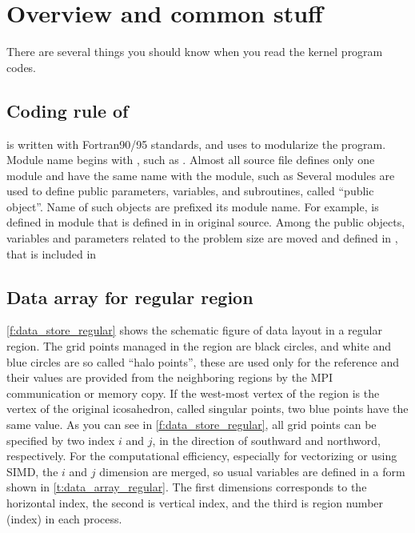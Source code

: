  \section{Overview and common stuff}

There are several things you should know when you read
the kernel program codes.

\subsection{Coding rule of \NICAM}

\NICAM is written with Fortran90/95 standards, and uses  to
modularize the program.
%
Module name begins with , such as .
%
Almost all source file defines only one module and have the same name
with the module, such as 
%
Several modules are used to define public parameters, variables, and
subroutines, called ``public object''.
%
Name of such objects are prefixed its module name.
%
For example,  is defined in module  that is
defined in  in original \NICAM source.
%
Among the public objects, variables and parameters related to the
problem size are moved and defined in , that is
included in 

\subsection{Data array for regular region}

\autoref{f:data_store_regular} shows the schematic figure of data layout
in a regular region.
%
The grid points managed in the region are black circles, and white and
blue circles are so called ``halo points'', these are used only for the
reference and their values are provided from the neighboring regions by
the MPI communication or memory copy.
%
If the west-most vertex of the region is the vertex of the original
icosahedron, called singular points, two blue points have the same
value.
%
As you can see in \autoref{f:data_store_regular}, all grid points can be
specified by two index $i$ and $j$, in the direction of southward and
northword, respectively.
%
For the computational efficiency, especially for vectorizing or using
SIMD, the $i$ and $j$ dimension are merged, so usual variables are
defined in a form shown in \autoref{t:data_array_regular}.
%
The first dimensions corresponds to the horizontal index, the second is
vertical index, and the third is region number (index) in each process.


